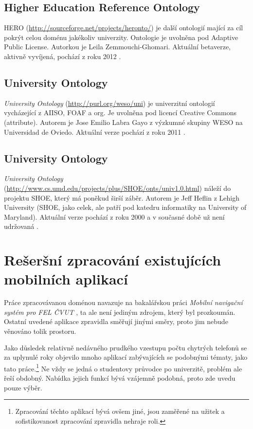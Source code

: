 \subsection{Higher Education Reference Ontology}
\Gls{HERO} (\url{http://sourceforge.net/projects/heronto/}) je další ontologií mající za cíl pokrýt celou doménu jakékoliv univerzity. Ontologie je uvolněna pod Adaptive Public License. Autorkou je Leila Zemmouchi-Ghomari. Aktuální betaverze, aktivně vyvíjená, pochází z roku 2012 \cite{Hero}.

\subsection{University Ontology}
\emph{University Ontology} (\url{http://purl.org/weso/uni}) je univerzitní ontologií vycházející z \gls{AIISO}, \gls{FOAF} a \gls{org}. Je uvolněna pod licencí Creative Commons (attribute). Autorem je Jose Emilio Labra Gayo z výzkumné skupiny WESO na Universidad de Oviedo. Aktuální verze pochází z roku 2011 \cite{Weso}.

\subsection{University Ontology}
\emph{University Ontology} (\url{http://www.cs.umd.edu/projects/plus/SHOE/onts/univ1.0.html}) náleží do projektu \gls{SHOE}, který má poněkud širší záběr. Autorem je Jeff Heflin z Lehigh University (\gls{SHOE}, jako celek, ale patří pod katedru informatiky na University of Maryland). Aktuální verze pochází z roku 2000 a v současné době už není udržovaná \cite{Shoe}.


\section{Rešeršní zpracování existujících mobilních aplikací}
Práce zpracovávanou doménou navazuje na bakalářskou práci \textit{Mobilní navigační systém pro FEL ČVUT} \cite{Bakalarka}, ta ale není jediným zdrojem, který byl prozkoumán. Ostatní uvedené aplikace zpravidla směřují jinými směry, proto jim nebude věnováno tolik prostoru.

Jako důsledek relativně nedávného prudkého vzestupu počtu chytrých telefonů se za uplynulé roky objevilo mnoho aplikací zabývajících se podobnými tématy, jako tato práce.\footnote{Zpracování těchto aplikací bývá ovšem jiné, jsou zaměřené na užitek a sofistikovanost zpracování zpravidla nehraje roli.} Ne vždy se jedná o studentovy průvodce po univerzitě, problém ale řeší obdobný. Nabídka jejich funkcí bývá vzájemně podobná, proto zde uvedu pouze výběr.

